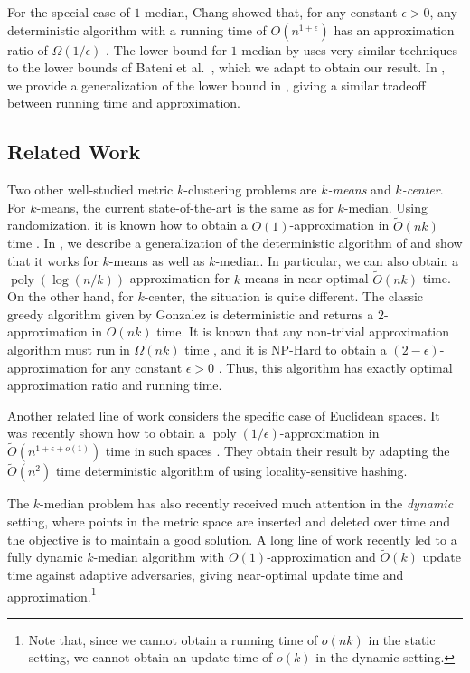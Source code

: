 \documentclass[11pt]{article}
\newcommand{\1}{\mathmybb{1}}
\DeclareMathOperator*{\poly}{poly}
\begin{document}
For the special case of $1$-median, Chang showed that, for any constant $\epsilon > 0$, any deterministic algorithm with a running time of $O(n^{1 + \epsilon})$ has an approximation ratio of $\Omega (1/\epsilon)$ \cite{Chang16}. The lower bound for $1$-median by \cite{Chang16} uses very similar techniques to the lower bounds of Bateni et al.~\cite{BateniEFHJMW23}, which we adapt to obtain our result. In , we provide a generalization of the lower bound in , giving a similar tradeoff between running time and approximation.


\subsection{Related Work}\label{sec:related}

Two other well-studied metric $k$-clustering problems are \emph{$k$-means} and \emph{$k$-center}.
For $k$-means, the current state-of-the-art is the same as for $k$-median. Using randomization, it is known how to obtain a $O(1)$-approximation in $\tilde O(nk)$ time \cite{MettuP02}. In , we describe a generalization of the deterministic algorithm of \cite{focs/GuhaMMO00} and show that it works for $k$-means as well as $k$-median. In particular, we can also obtain a $\poly(\log(n/k))$-approximation for $k$-means in near-optimal $\tilde O(nk)$ time. On the other hand, for $k$-center, the situation is quite different. The classic greedy algorithm given by Gonzalez \cite{tcs/Gonzalez85} is deterministic and returns a $2$-approximation in $O(nk)$ time. It is known that any non-trivial approximation algorithm must run in $\Omega(nk)$ time \cite{BateniEFHJMW23}, and it is NP-Hard to obtain a $(2 - \epsilon)$-approximation for any constant $\epsilon > 0$ \cite{dam/HsuN79}. Thus, this algorithm has exactly optimal approximation ratio and running time.

Another related line of work considers the specific case of Euclidean spaces. It was recently shown how to obtain a $\poly(1/\epsilon)$-approximation in $\tilde O(n^{1 + \epsilon + o(1)})$ time in such spaces \cite{DupreS24}. They obtain their result by adapting the $\tilde O(n^2)$ time deterministic algorithm of \cite{MettuP00} using locality-sensitive hashing.

The $k$-median problem has also recently received much attention in the \emph{dynamic} setting, where points in the metric space are inserted and deleted over time and the objective is to maintain a good solution. A long line of work \cite{nips/Cohen-AddadHPSS19,HenzingerK20,ourneurips2023,esa/TourHS24,focs/BCLP24,ourstoc25} recently led to a fully dynamic $k$-median algorithm with $O(1)$-approximation and $\tilde O(k)$ update time against adaptive adversaries, giving near-optimal update time and approximation.\footnote{Note that, since we cannot obtain a running time of $o(nk)$ in the static setting, we cannot obtain an update time of $o(k)$ in the dynamic setting.}
\end{document}
